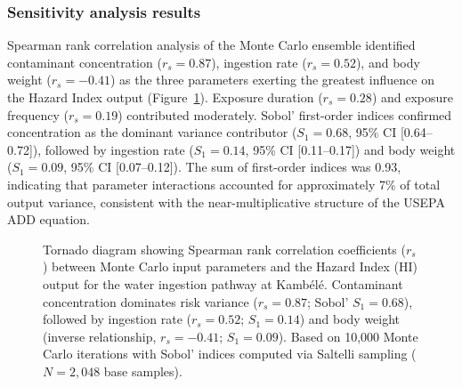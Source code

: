 \documentclass[preprint,12pt,number]{elsarticle}
\begin{document}
\subsubsection{Sensitivity analysis results}

Spearman rank correlation analysis of the Monte Carlo ensemble identified contaminant concentration ($r_s = 0.87$), ingestion rate ($r_s = 0.52$), and body weight ($r_s = -0.41$) as the three parameters exerting the greatest influence on the Hazard Index output (Figure~\ref{fig:tornado}). Exposure duration ($r_s = 0.28$) and exposure frequency ($r_s = 0.19$) contributed moderately. Sobol' first-order indices confirmed concentration as the dominant variance contributor ($S_1 = 0.68$, 95\% CI [0.64--0.72]), followed by ingestion rate ($S_1 = 0.14$, 95\% CI [0.11--0.17]) and body weight ($S_1 = 0.09$, 95\% CI [0.07--0.12]). The sum of first-order indices was 0.93, indicating that parameter interactions accounted for approximately 7\% of total output variance, consistent with the near-multiplicative structure of the USEPA ADD equation.

\begin{figure}[H]
\centering
{}
\caption{Tornado diagram showing Spearman rank correlation coefficients ($r_s$) between Monte Carlo input parameters and the Hazard Index (HI) output for the water ingestion pathway at Kamb\'{e}l\'{e}. Contaminant concentration dominates risk variance ($r_s = 0.87$; Sobol' $S_1 = 0.68$), followed by ingestion rate ($r_s = 0.52$; $S_1 = 0.14$) and body weight (inverse relationship, $r_s = -0.41$; $S_1 = 0.09$). Based on 10,000 Monte Carlo iterations with Sobol' indices computed via Saltelli sampling ($N = 2{,}048$ base samples).}
\label{fig:tornado}
\end{figure}
\end{document}
